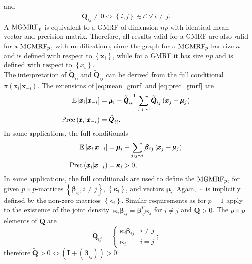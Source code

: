 and
\begin{equation*}
    \widetilde{\pmb{Q}}_{ij}\neq0\Longleftrightarrow\left\lbrace i,j\right\rbrace\in\mathcal{E}\,\forall\,i\neq j.
\end{equation*}
A $\hbox{MGMRF}_p$ is equivalent to a GMRF of dimension $np$ with identical mean vector and precision matrix.  Therefore, all results valid for a GMRF are also valid for a $\hbox{MGMRF}_p$, with modifications, since the graph for a $\hbox{MGMRF}_p$ has size $n$ and is defined with respect to $\left\lbrace\pmb{x}_i\right\rbrace$, while for a GMRF it has size $np$ and is defined with respect to $\left\lbrace x_i\right\rbrace$.  \\
The interpretation of $\widetilde{\pmb{Q}}_{ii}$ and $\widetilde{\pmb{Q}}_{ij}$ can be derived from the full conditional $\pi\left(\pmb{x}_i|\pmb{x}_{-i}\right)$. The extensions of \eqref{eq:mean_gmrf} and \eqref{eq:prec_gmrf} are
\begin{align}
    \mathbb{E}\left[\pmb{x}_i|\pmb{x}_{-i}\right]&=\pmb{\mu}_i-\widetilde{\pmb{Q}}_{ii}^{-1}\sum_{j:j\sim i}\widetilde{\pmb{Q}}_{ij}\left(\pmb{x}_j-\pmb{\mu}_j\right)\\
    \hbox{Prec}\left(\pmb{x}_i|\pmb{x}_{-i}\right) &= \widetilde{\pmb{Q}}_{ii}.
\end{align}
In some applications, the full conditionals
\begin{align}
    \mathbb{E}\left[\pmb{x}_i|\pmb{x}_{-i}\right] &= \pmb{\mu}_i-\sum_{j:j\sim i}\pmb{\beta}_{ij}\left(\pmb{x}_j-\pmb{\mu}_j\right) \\
    \hbox{Prec}\left(\pmb{x}_i|\pmb{x}_{-i}\right) &= \pmb{\kappa}_i > 0,
\end{align}
In some applications, the full conditionals are used to define the $\hbox{MGMRF}_p$, for given $p\times p$-matrices $\left\lbrace\pmb{\beta}_{ij},i\neq j\right\rbrace$, $\left\lbrace\pmb{\kappa}_i\right\rbrace$, and vectors $\pmb{\mu}_i$. Again, $\sim$ is implicitly defined by the non-zero matrices $\left\lbrace\pmb{\kappa}_i\right\rbrace$. Similar requirements as for $p=1$ apply to the existence of the joint density: $\pmb{\kappa}_i\pmb{\beta}_{ij}=\pmb{\beta}_{ij}^T\pmb{\kappa}_j$ for $i\neq j$ and $\widetilde{\pmb{Q}} > 0$. The $p\times p$ elements of $\widetilde{\pmb{Q}}$ are
\begin{equation*}
    \widetilde{\pmb{Q}}_{ij}=\begin{cases}
    \pmb{\kappa}_i\pmb{\beta}_{ij} & i\neq j \\
    \pmb{\kappa}_i & i=j
    \end{cases};
\end{equation*}
therefore $\widetilde{\pmb{Q}}>0\Longleftrightarrow\left(\pmb{I}+\left(\pmb{\beta}_{ij}\right)\right) > 0$\autocite[Cf.][]{rue2005gaussian}.
